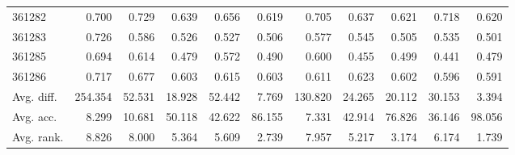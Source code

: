 \begin{tabular}{lrrrrrrrrrr}
361282 & 0.700 & 0.729 & 0.639 & 0.656 & 0.619 & 0.705 & 0.637 & 0.621 & 0.718 & 0.620 \\
361283 & 0.726 & 0.586 & 0.526 & 0.527 & 0.506 & 0.577 & 0.545 & 0.505 & 0.535 & 0.501 \\
361285 & 0.694 & 0.614 & 0.479 & 0.572 & 0.490 & 0.600 & 0.455 & 0.499 & 0.441 & 0.479 \\
361286 & 0.717 & 0.677 & 0.603 & 0.615 & 0.603 & 0.611 & 0.623 & 0.602 & 0.596 & 0.591 \\
Avg. diff. & 254.354 & 52.531 & 18.928 & 52.442 & 7.769 & 130.820 & 24.265 & 20.112 & 30.153 & 3.394 \\
Avg. acc. & 8.299 & 10.681 & 50.118 & 42.622 & 86.155 & 7.331 & 42.914 & 76.826 & 36.146 & 98.056 \\
Avg. rank. & 8.826 & 8.000 & 5.364 & 5.609 & 2.739 & 7.957 & 5.217 & 3.174 & 6.174 & 1.739 \\
\bottomrule
\end{tabular}
